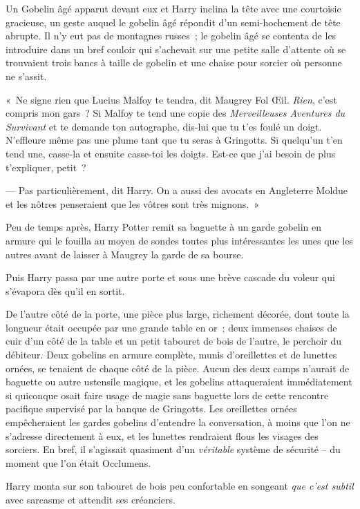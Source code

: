 Un Gobelin âgé apparut devant eux et Harry inclina la tête avec une courtoisie gracieuse, un geste auquel le gobelin âgé répondit d'un semi-hochement de tête abrupte. Il n'y eut pas de montagnes russes~; le gobelin âgé se contenta de les introduire dans un bref couloir qui s'achevait sur une petite salle d'attente où se trouvaient trois bancs à taille de gobelin et une chaise pour sorcier où personne ne s'assit.

«~Ne signe rien que Lucius Malfoy te tendra, dit Maugrey Fol Œil. \emph{Rien}, c'est compris mon gars~? Si Malfoy te tend une copie des \emph{Merveilleuses Aventures du Survivant} et te demande ton autographe, dis-lui que tu t'es foulé un doigt. N'effleure même pas une plume tant que tu seras à Gringotts. Si quelqu'un t'en tend une, casse-la et ensuite casse-toi les doigts. Est-ce que j'ai besoin de plus t'expliquer, petit~?

--- Pas particulièrement, dit Harry. On a aussi des avocats en Angleterre Moldue et les nôtres penseraient que les vôtres sont très mignons.~»

Peu de temps après, Harry Potter remit sa baguette à un garde gobelin en armure qui le fouilla au moyen de sondes toutes plus intéressantes les unes que les autres avant de laisser à Maugrey la garde de sa bourse.

Puis Harry passa par une autre porte et sous une brève cascade du voleur qui s'évapora dès qu'il en sortit.

De l'autre côté de la porte, une pièce plus large, richement décorée, dont toute la longueur était occupée par une grande table en or~; deux immenses chaises de cuir d'un côté de la table et un petit tabouret de bois de l'autre, le perchoir du débiteur. Deux gobelins en armure complète, munis d'oreillettes et de lunettes ornées, se tenaient de chaque côté de la pièce. Aucun des deux camps n'aurait de baguette ou autre ustensile magique, et les gobelins attaqueraient immédiatement si quiconque osait faire usage de magie sans baguette lors de cette rencontre pacifique supervisé par la banque de Gringotts. Les oreillettes ornées empêcheraient les gardes gobelins d'entendre la conversation, à moins que l'on ne s'adresse directement à eux, et les lunettes rendraient flous les visages des sorciers. En bref, il s'agissait quasiment d'un \emph{véritable} système de sécurité -- du moment que l'on était Occlumens.

Harry monta sur son tabouret de bois peu confortable en songeant \emph{que c'est subtil} avec sarcasme et attendit ses créanciers.

